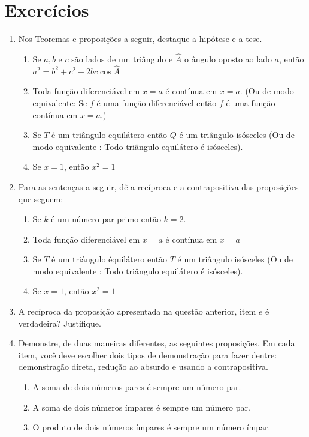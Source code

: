 \section{Exercícios}
\begin{enumerate}
    \item Nos Teoremas e proposições a seguir, destaque a hipótese e a tese.
    \begin{enumerate}
        \item Se $a,b$ e $c$ são lados de um triângulo e $\hat{A}$ o ângulo oposto ao lado $a$, então $a^2 = b^2 + c^2 - 2bc \cos \hat{A}$
        \item Toda função diferenciável em $x=a$ é contínua em $x=a$. (Ou de modo equivalente: Se $f$ é uma função diferenciável então $f$ é uma função contínua em $x=a$.)
        \item Se $T$ é um triângulo equilátero então $Q$ é um triângulo isósceles (Ou de modo equivalente : Todo triângulo equilátero é isósceles).
        \item Se $x=1$, então $x^2=1$
    \end{enumerate}
   \item Para as sentenças a seguir, dê a recíproca e a contrapositiva das proposições que seguem:
   \begin{enumerate}
       \item Se $k$ é um número par primo então $k=2$.
       \item Toda função diferenciável em $x=a$ é contínua em $x=a$
        \item Se $T$ é um triângulo équilátero então $T$ é um triângulo isósceles (Ou de modo equivalente : Todo triângulo equilátero é isósceles).
        \item Se $x=1$, então $x^2=1$
   \end{enumerate}
   \item A recíproca da proposição apresentada na questão anterior, item $e$ é verdadeira? Justifique.
    \item Demonstre, de duas maneiras diferentes, as seguintes proposições. Em cada item, você deve escolher dois tipos de demonstração para fazer dentre: demonstração direta, redução ao absurdo e usando a contrapositiva.
    \begin{enumerate}
        \item A soma de dois números pares é sempre um número par.
        \item A soma de dois números ímpares é sempre um número par.
        \item O produto de dois números ímpares é sempre um número ímpar.

\end{enumerate}
\end{enumerate}
